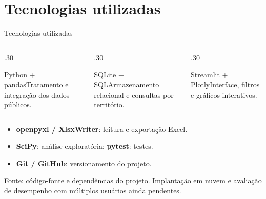 \documentclass[aspectratio=169]{beamer}
\newcommand{\fonte}[1]{\vfill{\tiny\color{InfGray}#1\par}}
\begin{document}
\section{Tecnologias utilizadas}
\begin{frame}[t]{Tecnologias utilizadas}
\vspace{4mm}
\begin{columns}[T,onlytextwidth]
\begin{column}{.30\textwidth}\begin{block}{Python + pandas}Tratamento e integração dos dados públicos.\end{block}\end{column}
\begin{column}{.30\textwidth}\begin{block}{SQLite + SQL}Armazenamento relacional e consultas por território.\end{block}\end{column}
\begin{column}{.30\textwidth}\begin{block}{Streamlit + Plotly}Interface, filtros e gráficos interativos.\end{block}\end{column}
\end{columns}
\vspace{5mm}
\begin{itemize}\setlength{\itemsep}{2mm}
\item \textbf{openpyxl / XlsxWriter}: leitura e exportação Excel.
\item \textbf{SciPy}: análise exploratória; \textbf{pytest}: testes.
\item \textbf{Git / GitHub}: versionamento do projeto.
\end{itemize}
\fonte{Fonte: código-fonte e dependências do projeto. Implantação em nuvem e avaliação de desempenho com múltiplos usuários ainda pendentes.}
\end{frame}
\end{document}
